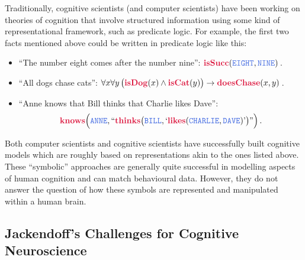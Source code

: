 \documentclass[10pt,letterpaper,oneside]{article}
\begin{document}
Traditionally, cognitive scientists (and computer scientists) have been working on theories of cognition that involve structured information using some kind of representational framework, such as predicate logic. For example, the first two facts mentioned above could be written in predicate logic like this:
\newcommand{\Pred}[1]{\mathbf{\textcolor{Crimson}{#1}}}
\newcommand{\Obj}[1]{\mathtt{\textcolor{RoyalBlue}{#1}}}
\newcommand{\Fun}[1]{\mathit{\textcolor{ForestGreen}{#1}}}
\begin{itemize}
	\item \enquote{The number eight comes after the number nine}: $\Pred{isSucc}(\Obj{EIGHT}, \Obj{NINE})\,$.
	\item \enquote{All dogs chase cats}: $\forall x \forall y \, \big ( \Pred{isDog}(x) \wedge \Pred{isCat}(y) \big) \rightarrow \Pred{doesChase}(x, y)\,$.
	\item \enquote{Anne knows that Bill thinks that Charlie likes Dave}:$$\Pred{knows}\Big(\Obj{ANNE}, ``\Pred{thinks}\big(\Obj{BILL}, `\Pred{likes}(\Obj{CHARLIE}, \Obj{DAVE})\text{'}\big)\text{''}\Big)\,.$$
\end{itemize}
Both computer scientists and cognitive scientists have successfully built cognitive models which are roughly based on representations akin to the ones listed above. These \enquote{symbolic} approaches are generally quite successful in modelling aspects of human cognition and can match behavioural data. However, they do not answer the question of how these symbols are represented and manipulated within a human brain.

\subsection{Jackendoff's Challenges for Cognitive Neuroscience}
\end{document}

